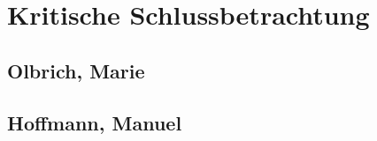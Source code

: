 \documentclass[a4paper, 11pt, fleqn, DIV=10, twoside, BCOR=10mm]{scrreprt}
\begin{document}
\chapter{Kritische Schlussbetrachtung}
\section{Olbrich, Marie}
 
\section{Hoffmann, Manuel}
 



\end{document}
